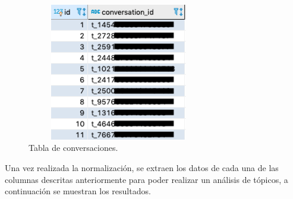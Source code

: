     \begin{figure}[H]
         \centering
         \includegraphics[height=6cm, width=8cm]{Latex/Classes/Imagenes/conversation-table.png}
         \caption{Tabla de conversaciones.}
         \label{fig:sql-conversation-table}
    \end{figure}
    
    Una vez realizada la normalización, se extraen los datos de cada una de las columnas descritas anteriormente para poder realizar un análisis de tópicos, a continuación se muestran los resultados. \newpage
    
